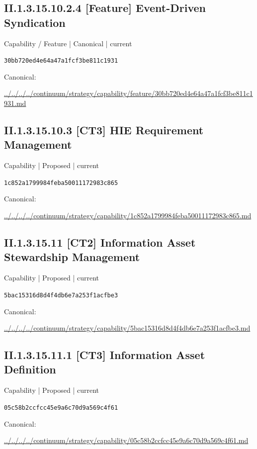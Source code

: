 \documentclass[10pt,a4paper]{article}
\begin{document}
\subsection*{II.1.3.15.10.2.4 [Feature] Event-Driven Syndication}
{\small Capability / Feature | Canonical | current}\par
\texttt{30bb720ed4e64a47a1fcf3be811c1931}\par
Canonical: \par
{\footnotesize\url{../../../../continuum/strategy/capability/feature/30bb720ed4e64a47a1fcf3be811c1931.md}}\par
\subsection*{II.1.3.15.10.3 [CT3] HIE Requirement Management}
{\small Capability | Proposed | current}\par
\texttt{1c852a1799984feba50011172983c865}\par
Canonical: \par
{\footnotesize\url{../../../../continuum/strategy/capability/1c852a1799984feba50011172983c865.md}}\par
\subsection*{II.1.3.15.11 [CT2] Information Asset Stewardship Management}
{\small Capability | Proposed | current}\par
\texttt{5bac15316d8d4f4db6e7a253f1acfbe3}\par
Canonical: \par
{\footnotesize\url{../../../../continuum/strategy/capability/5bac15316d8d4f4db6e7a253f1acfbe3.md}}\par
\subsection*{II.1.3.15.11.1 [CT3] Information Asset Definition}
{\small Capability | Proposed | current}\par
\texttt{05c58b2ccfcc45e9a6c70d9a569c4f61}\par
Canonical: \par
{\footnotesize\url{../../../../continuum/strategy/capability/05c58b2ccfcc45e9a6c70d9a569c4f61.md}}\par
\end{document}
